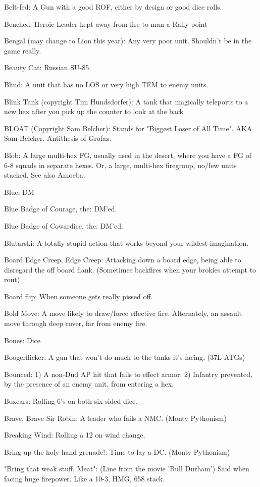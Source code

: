 \documentclass[letterpaper]{article}
\begin{document}
Belt-fed: A Gun with a good ROF, either by design or good dice rolls.

Benched: Heroic Leader kept away from fire to man a Rally point

Bengal (may change to Lion this year):  Any very poor unit.  Shouldn't be in the game really.

Beauty Cat: Russian SU-85.

Blind: A unit that has no LOS or very high TEM to enemy units.

Blink Tank (copyright Tim Hundsdorfer): A tank that magically teleports to a
new hex after you pick up the counter to look at the back

BLOAT (Copyright Sam Belcher): Stands for "Biggest Loser of All Time". AKA Sam Belcher. Antithesis of Grofaz.

Blob: A large multi-hex FG, usually used in the desert, where you have a FG of 6-8 squads in separate hexes. Or, a large, multi-hex firegroup, no/few units stacked. See also Amoeba.

Blue: DM

Blue Badge of Courage, the: DM'ed.

Blue Badge of Cowardice, the: DM'ed.

Blutarski: A totally stupid action that works beyond your wildest imagination.

Board Edge Creep, Edge Creep: Attacking down a board edge, being able to disregard the off board flank. (Sometimes backfires when your brokies attempt to rout)

Board flip:  When someone gets really pissed off.

Bold Move: A move likely to draw/force effective fire. Alternately, an assault move through deep cover, far from enemy fire.

Bones: Dice

Boogerflicker: A gun that won't do much to the tanks it's facing. (37L ATGs)

Bounced: 1) A non-Dud AP hit that fails to effect armor. 2) Infantry prevented, by the presence of an enemy unit, from entering a hex.

Boxcars: Rolling 6's on both six-sided dice.

Brave, Brave Sir Robin:  A leader who fails a NMC. (Monty Pythonism)

Breaking Wind: Rolling a 12 on wind change.

Bring up the holy hand grenade!: Time to lay a DC. (Monty Pythonism)

"Bring that weak stuff, Meat": (Line from the movie 'Bull Durham') Said when facing huge firepower. Like a 10-3, HMG, 658 stack.
\end{document}
